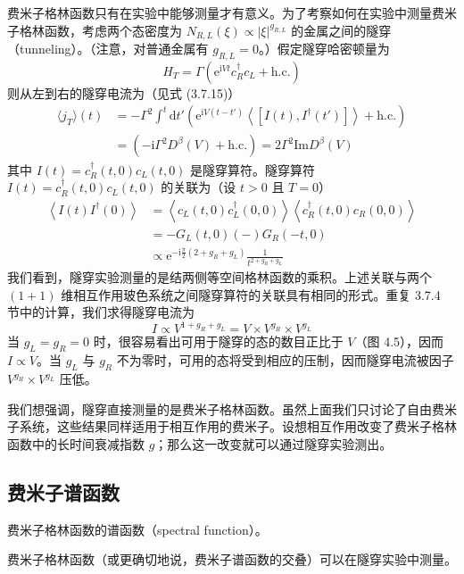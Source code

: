费米子格林函数只有在实验中能够测量才有意义。为了考察如何在实验中测量费米子格林函数，考虑两个态密度为 $N_{R,L}(\xi) \propto |\xi|^{g_{R,L}}$ 的金属之间的隧穿（tunneling）。（注意，对普通金属有 $g_{R,L} = 0$。）假定隧穿哈密顿量为
\begin{equation*}
H_{T} = \Gamma(\mathrm{e}^{\mathrm{i}Vt}c_{R}^{\dagger}c_{L} + \text{h.c.})
\end{equation*}
则从左到右的隧穿电流为（见式 (3.7.15)）
\begin{align*}
\langle j_{T}\rangle(t) &= -\Gamma^{2}\int^{t}\mathrm{d}t'\left(\mathrm{e}^{\mathrm{i}V(t-t')}\left\langle [I(t), I^{\dagger}(t')]\right\rangle + \text{h.c.}\right)\\
&= (-\mathrm{i}\Gamma^{2}D^{\beta}(V) + \text{h.c.}) = 2\Gamma^{2}\mathrm{Im}D^{\beta}(V)
\end{align*}
其中 $I(t) = c_{R}^{\dagger}(t,0)c_{L}(t,0)$ 是隧穿算符。隧穿算符 $I(t) = c_{R}^{\dagger}(t,0)c_{L}(t,0)$ 的关联为（设 $t > 0$ 且 $T = 0$）
\begin{align*}
\left\langle I(t)I^{\dagger}(0)\right\rangle &= \left\langle c_{L}(t,0)c_{L}^{\dagger}(0,0)\right\rangle\left\langle c_{R}^{\dagger}(t,0)c_{R}(0,0)\right\rangle\\
&= -G_{L}(t,0)(-)G_{R}(-t,0)\\
&\propto \mathrm{e}^{-\mathrm{i}\frac{\pi}{2}(2+g_{R}+g_{L})}\frac{1}{t^{2+g_{R}+g_{L}}}
\end{align*}
我们看到，隧穿实验测量的是结两侧等空间格林函数的乘积。上述关联与两个 $(1+1)$ 维相互作用玻色系统之间隧穿算符的关联具有相同的形式。重复 3.7.4 节中的计算，我们求得隧穿电流为
\begin{equation*}
I \propto V^{1+g_{R}+g_{L}} = V \times V^{g_{R}} \times V^{g_{L}}
\end{equation*}
当 $g_{L} = g_{R} = 0$ 时，很容易看出可用于隧穿的态的数目正比于 $V$（图 4.5），因而 $I \propto V$。当 $g_{L}$ 与 $g_{R}$ 不为零时，可用的态将受到相应的压制，因而隧穿电流被因子 $V^{g_{R}} \times V^{g_{L}}$ 压低。

我们想强调，隧穿直接测量的是费米子格林函数。虽然上面我们只讨论了自由费米子系统，这些结果同样适用于相互作用的费米子。设想相互作用改变了费米子格林函数中的长时间衰减指数 $g$；那么这一改变就可以通过隧穿实验测出。

\subsection{费米子谱函数}

\begin{keypoints}
\item 费米子格林函数的谱函数（spectral function）。
\item 费米子格林函数（或更确切地说，费米子谱函数的交叠）可以在隧穿实验中测量。
\end{keypoints}

